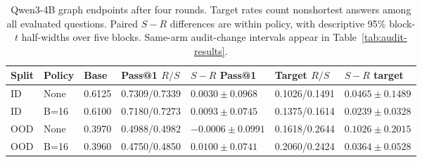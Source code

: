 \begin{table}[H]
\caption{Qwen3-4B graph endpoints after four rounds. Target rates count nonshortest answers among all evaluated questions. Paired $S-R$ differences are within policy, with descriptive 95\% block-$t$ half-widths over five blocks. Same-arm audit-change intervals appear in Table~\ref{tab:audit-results}.}
\label{tab:qwen4b-endpoints}
\centering\small\setlength{\tabcolsep}{3pt}
\begin{tabular}{@{}lllllll@{}}
\toprule
Split & Policy & Base & Pass@1 $R/S$ & $S-R$ Pass@1 & Target $R/S$ & $S-R$ target\\
\midrule
ID & None & 0.6125 & 0.7309/0.7339 & $0.0030\pm0.0968$ & 0.1026/0.1491 & $0.0465\pm0.1489$\\
ID & B=16 & 0.6100 & 0.7180/0.7273 & $0.0093\pm0.0745$ & 0.1375/0.1614 & $0.0239\pm0.0328$\\
OOD & None & 0.3970 & 0.4988/0.4982 & $-0.0006\pm0.0991$ & 0.1618/0.2644 & $0.1026\pm0.2015$\\
OOD & B=16 & 0.3960 & 0.4750/0.4850 & $0.0100\pm0.0741$ & 0.2060/0.2424 & $0.0364\pm0.0528$\\
\bottomrule
\end{tabular}
\end{table}
